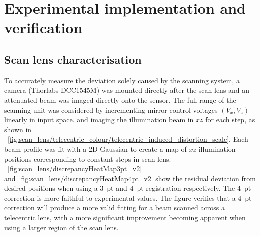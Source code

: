 \fi
\section{Experimental implementation and verification}


\subsection{Scan lens characterisation}

To accurately measure the deviation solely caused by the scanning system, a camera (Thorlabs DCC1545M) was mounted directly after the scan lens and an attenuated beam was imaged directly onto the sensor.
The full range of the scanning unit was considered by incrementing mirror control voltages \((V_x, V_z)\) linearly in input space.
and imaging the illumination beam in \(xz\) for each step,
as shown in \figurename~\ref{fig:scan_lens/telecentric_colour/telecentric_induced_distortion_scale}.
Each beam profile was fit with a 2D Gaussian to create a map of \(xz\) illumination positions corresponding to constant steps in scan lens.
\figurename~\ref{fig:scan_lens/discrepancyHeatMap3pt_v2} and~\ref{fig:scan_lens/discrepancyHeatMap4pt_v2} show the residual deviation from desired positions when using a 3~pt and 4~pt registration respectively.
The 4~pt correction is more faithful to experimental values.
The figure verifies that a 4~pt correction %
will produce a more valid fitting for a beam scanned across a telecentric lens, with a more significant improvement becoming apparent when using a larger region of the scan lens.

